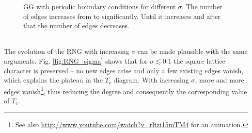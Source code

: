 \begin{figure}[htbp]
            \caption[Examples of GG for different $\sigma$]
            {
                GG with periodic boundary conditions for different \(\sigma\).
                The number of edges increases from 
                to  significantly. Until 
                it increases and after that the number of edges decreases.
            }
            \label{fig:GG_sigma}
        \end{figure}\\
        The evolution of the RNG with increasing \(\sigma\) can be made plausible
        with the same arguments. Fig. \ref{fig:RNG_sigma}
        shows that for \(\sigma \lesssim 0.1\) the square lattice character is
        preserved -- no new edges arise and only a few existing edges vanish, which
        explains the plateau in the \(T_{c}\) diagram. With
        increasing \(\sigma\), more and more edges vanish\footnote{See also \url{http://www.youtube.com/watch?v=rltzi15mTM4} for an animation.},
        thus reducing the degree and consequently the corresponding value of \(T_{c}\).
